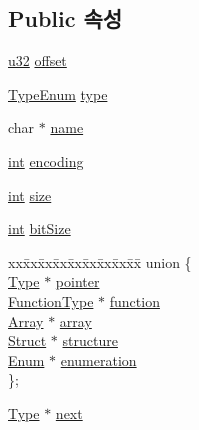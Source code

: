 \subsection*{Public 속성}
\begin{DoxyCompactItemize}
\item 
\mbox{\hyperlink{_system_8h_a10e94b422ef0c20dcdec20d31a1f5049}{u32}} \mbox{\hyperlink{struct_type_a1da9bf1a40d9e23c0c03b291b00e7521}{offset}}
\item 
\mbox{\hyperlink{elf_8h_a600075cb26e64fe549c214f4c5b16b70}{Type\+Enum}} \mbox{\hyperlink{struct_type_a22ff3703af18731e0965866dab0a219f}{type}}
\item 
char $\ast$ \mbox{\hyperlink{struct_type_a40204c03d16be33365f3ebfc8f0efdc6}{name}}
\item 
\mbox{\hyperlink{_util_8cpp_a0ef32aa8672df19503a49fab2d0c8071}{int}} \mbox{\hyperlink{struct_type_a8a28b973d98063a67755e710d6383feb}{encoding}}
\item 
\mbox{\hyperlink{_util_8cpp_a0ef32aa8672df19503a49fab2d0c8071}{int}} \mbox{\hyperlink{struct_type_a871302dc63ac1a37c0b6a225cf82048d}{size}}
\item 
\mbox{\hyperlink{_util_8cpp_a0ef32aa8672df19503a49fab2d0c8071}{int}} \mbox{\hyperlink{struct_type_a15eb0924ca4d483bf9dd0d7e4029b60c}{bit\+Size}}
\item 
\begin{tabbing}
xx\=xx\=xx\=xx\=xx\=xx\=xx\=xx\=xx\=\kill
union \{\\
\>\mbox{\hyperlink{struct_type}{Type}} $\ast$ \mbox{\hyperlink{struct_type_a47e2e4b5c179cc331ce50ebba3b9308b}{pointer}}\\
\>\mbox{\hyperlink{struct_function_type}{FunctionType}} $\ast$ \mbox{\hyperlink{struct_type_aeed63343ba804730a8b477a288d3be41}{function}}\\
\>\mbox{\hyperlink{struct_array}{Array}} $\ast$ \mbox{\hyperlink{struct_type_a5144affb9491fc424e1a8a4ee315d001}{array}}\\
\>\mbox{\hyperlink{struct_struct}{Struct}} $\ast$ \mbox{\hyperlink{struct_type_a2db050f37fd4bd027748355abf258dcf}{structure}}\\
\>\mbox{\hyperlink{struct_enum}{Enum}} $\ast$ \mbox{\hyperlink{struct_type_ae7e05fc19fc6d70ef0c5c2ee14bfc34f}{enumeration}}\\
\}; \\

\end{tabbing}\item 
\mbox{\hyperlink{struct_type}{Type}} $\ast$ \mbox{\hyperlink{struct_type_ada2a3b3d0180c6958e699fdc870fdbba}{next}}
\end{DoxyCompactItemize}


